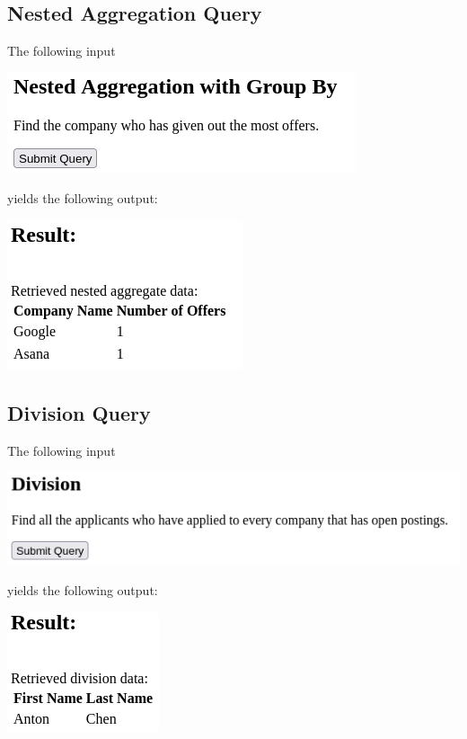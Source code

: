 \newpage

\subsection{Nested Aggregation Query}

The following input

\includegraphics[width=0.5\linewidth]{src/6/2022-03-30-180635_388x112_scrot.png}

yields the following output:

\includegraphics[width=\linewidth]{src/6/2022-03-30-180641_262x166_scrot.png}

\newpage

\subsection{Division Query}

The following input

\includegraphics[width=0.5\linewidth]{src/6/2022-03-30-180713_546x112_scrot.png}

yields the following output:

\includegraphics[width=\linewidth]{src/6/2022-03-30-180723_169x133_scrot.png}
